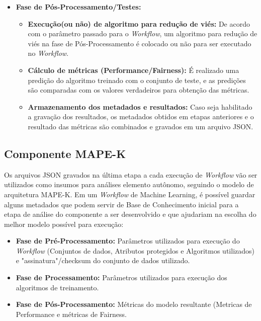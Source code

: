 \documentclass[portugues]{ic-tese}
\begin{document}
\begin{itemize}
\begin{itemize}
	\end{itemize}
\item \textbf{Fase de Pós-Processamento/Testes:}
	\begin{itemize}
	\item \textbf{Execução(ou não) de algoritmo para redução de viés:} De acordo com o parâmetro passado para o \textit{Workflow}, um algoritmo para redução de viés na fase de Pós-Processamento é colocado ou não para ser executado no \textit{Workflow}.
	\item \textbf{Cálculo de métricas (Performance/Fairness):} É realizado uma predição do algoritmo treinado com o conjunto de teste, e as predições são comparadas com os valores verdadeiros para obtenção das métricas.
	\item \textbf{Armazenamento dos metadados e resultados:} Caso seja habilitado a gravação dos resultados, os metadados obtidos em etapas anteriores e o resultado das métricas são combinados e gravados em um arquivo JSON.
	\end{itemize}
\end{itemize}

\subsection{Componente MAPE-K}

Os arquivos JSON gravados na última etapa a cada execução de \textit{Workflow} vão ser utilizados como insumos para análises elemento autônomo, seguindo o modelo de arquitetura MAPE-K. Em um \textit{Workflow} de Machine Learning, é possível guardar alguns metadados que podem servir de Base de Conhecimento inicial para a etapa de análise do componente a ser desenvolvido e que ajudariam na escolha do melhor modelo possível para execução:

\begin{itemize}
\item \textbf{Fase de Pré-Processamento:} Parâmetros utilizados para execução do \textit{Workflow} (Conjuntos de dados, Atributos protegidos e Algoritmos utilizados) e "assinatura"/checksum do conjunto de dados utilizado.
\item \textbf{Fase de Processamento:} Parâmetros utilizados para execução dos algoritmos de treinamento.
\item \textbf{Fase de Pós-Processamento:} Métricas do modelo resultante (Metricas de Performance e métricas de Fairness.
\end{itemize}
\end{document}
